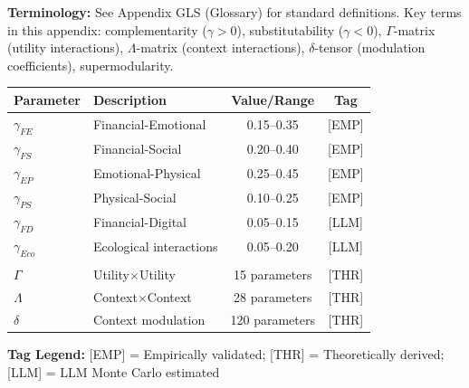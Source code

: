 
\begin{tcolorbox}[colback=gray!5!white, colframe=gray!50!black]
\textbf{Terminology:} See Appendix GLS (Glossary) for standard definitions.
Key terms in this appendix: complementarity ($\gamma > 0$), substitutability ($\gamma < 0$),
$\Gamma$-matrix (utility interactions), $\Lambda$-matrix (context interactions),
$\delta$-tensor (modulation coefficients), supermodularity.
\end{tcolorbox}

\begin{tcolorbox}[colback=blue!5!white, colframe=blue!75!black,
    title=\textbf{Epistemic Status: Key Parameters}]

\renewcommand{\arraystretch}{1.3}
\begin{tabular}{@{}llcc@{}}
\toprule
\textbf{Parameter} & \textbf{Description} & \textbf{Value/Range} & \textbf{Tag} \\
\midrule
$\gamma_{FE}$ & Financial-Emotional & 0.15--0.35 & [EMP] \\
$\gamma_{FS}$ & Financial-Social & 0.20--0.40 & [EMP] \\
$\gamma_{EP}$ & Emotional-Physical & 0.25--0.45 & [EMP] \\
$\gamma_{PS}$ & Physical-Social & 0.10--0.25 & [EMP] \\
$\gamma_{FD}$ & Financial-Digital & 0.05--0.15 & [LLM] \\
$\gamma_{Eco}$ & Ecological interactions & 0.05--0.20 & [LLM] \\
\addlinespace
\multicolumn{4}{@{}l}{\textit{Matrix dimensions:}} \\
$\Gamma$ & Utility$\times$Utility & 15 parameters & [THR] \\
$\Lambda$ & Context$\times$Context & 28 parameters & [THR] \\
$\delta$ & Context modulation & 120 parameters & [THR] \\
\bottomrule
\end{tabular}

\vspace{0.5em}
\textbf{Tag Legend:} [EMP] = Empirically validated; [THR] = Theoretically derived;
[LLM] = LLM Monte Carlo estimated

\end{tcolorbox}


